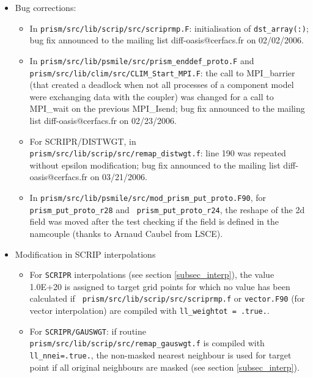 \begin{itemize}

\item Bug corrections:

  \begin{itemize}

  \item In {\tt prism/src/lib/scrip/src/scriprmp.F}: initialisation of
    {\tt dst\_array(:)}; bug fix announced to the mailing list
    diff-oasis@cerfacs.fr on 02/02/2006.

  \item In {\tt prism/src/lib/psmile/src/prism\_enddef\_proto.F} and {\tt
      prism/src/lib/\break clim/src/CLIM\_Start\_MPI.F}: the call to
    MPI\_barrier (that created a deadlock when not all processes of a
    component model were exchanging data with the coupler) was changed
    for a call to MPI\_wait on the previous MPI\_Isend; bug fix
    announced to the mailing list diff-oasis@cerfacs.fr on
    02/23/2006.

  \item For SCRIPR/DISTWGT, in {\tt
      prism/src/lib/scrip/src/remap\_distwgt.f}: line 190 was repeated
    without epsilon modification; bug fix announced to the mailing
    list diff-oasis@cerfacs.fr on 03/21/2006.

  \item In {\tt prism/src/lib/psmile/src/mod\_prism\_put\_proto.F90},
    for {\tt prism\_put\break \_proto\_r28} and {\tt
      prism\_put\_proto\_r24}, the reshape of the 2d field was moved
    after the test checking if the field is defined in the namcouple
    (thanks to Arnaud Caubel from LSCE).

  \end{itemize}

\item Modification in SCRIP interpolations

  \begin{itemize}

  \item For {\tt SCRIPR} interpolations (see section
    \ref{subsec_interp}), the value 1.0E+20 is assigned to target grid
    points for which no value has been calculated if {\tt
      prism/src/lib/scrip/src/scriprmp.f} or {\tt vector.F90} (for
    vector interpolation) are compiled with {\tt ll\_weightot =
      .true.}.

  \item For {\tt SCRIPR/GAUSWGT}: if routine {\tt
      prism/src/lib/scrip/src/remap\_gauswgt.f} is compiled with {\tt
      ll\_nnei=.true.}, the non-masked nearest neighbour is used for
    target point if all original neighbours are masked (see section
    \ref{subsec_interp}).


\end{itemize}
\end{itemize}

